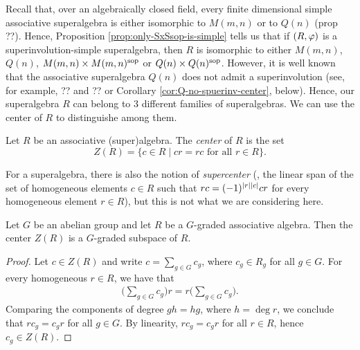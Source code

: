 Recall that, over an algebraically closed field, every finite dimensional simple associative superalgebra is either isomorphic to $M(m,n)$ or to $Q(n)$ (prop ??). 
Hence, Proposition \ref{prop:only-SxSsop-is-simple} tells us that if $(R, \varphi)$ is a superinvolution-simple superalgebra, then $R$ is isomorphic to either $M(m,n)$, $Q(n)$, $M(m,n) \times M(m,n)^{\mathrm{sop}}$ or $Q(n) \times Q(n)^{\mathrm{sop}}$.
However, it is well known that the associative superalgebra $Q(n)$ does not admit a superinvolution (see, for example, ?? and ?? or Corollary \ref{cor:Q-no-spuerinv-center}, below).
Hence, our superalgebra $R$ can belong to 3 different families of superalgebras. 
We can use the center of $R$ to distinguishe among them.

\begin{defi}
    Let $R$ be an associative (super)algebra.
    The \emph{center} of $R$ is the set 
    \[
        Z(R) = \{c\in R \mid cr = rc \text{ for all } r\in R \}.
    \]
\end{defi}

\begin{remark}
    For a superalgebra, there is also the notion of \emph{supercenter} (\ie, the linear span of the set of homogeneous elements $c \in R$ such that $rc = (-1)^{|r||c|} cr$ for every homogeneous element $r \in R$), but this is not what we are considering here.
\end{remark}



\begin{lemma}\label{lemma:center-is-graded}
    Let $G$ be an abelian group and let $R$ be a $G$-graded associative algebra.
    Then the center $Z(R)$ is a $G$-graded subspace of $R$. 
\end{lemma}

\begin{proof}
    Let $c \in Z(R)$ and write $c = \sum_{g\in G} c_g$, where $c_g \in R_g$ for all $g \in G$.
    For every homogeneous $r \in R$, we have that
    \begin{align*}
        \big(\sum_{g\in G} c_g\big)r = r \big(\sum_{g\in G} c_g\big).
    \end{align*}
    Comparing the components of degree $gh = hg$, where $h = \deg r$, we conclude that $rc_g = c_g r$ for all $g \in G$. 
    By linearity, $r c_g = c_g r$ for all $r\in R$, hence $c_g \in Z(R)$.
\end{proof}

